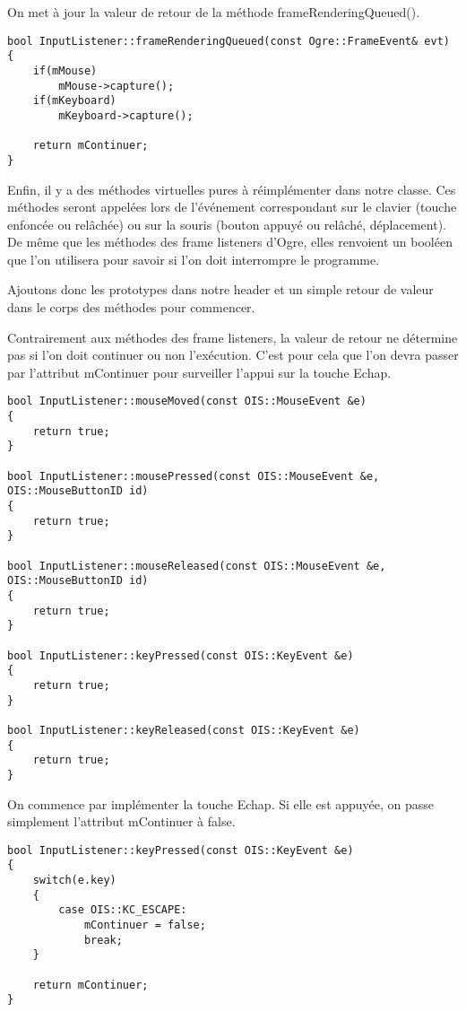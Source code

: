 On met \`a jour la valeur de retour de la m\'ethode frameRenderingQueued().

\begin{lstlisting}[caption={}]
bool InputListener::frameRenderingQueued(const Ogre::FrameEvent& evt)
{
    if(mMouse)
        mMouse->capture();
    if(mKeyboard)
        mKeyboard->capture();

    return mContinuer;
}
\end{lstlisting}

Enfin, il y a des m\'ethodes virtuelles pures \`a r\'eimpl\'ementer dans notre classe. Ces m\'ethodes seront appel\'ees lors de l'\'ev\'enement correspondant sur le clavier (touche enfonc\'ee ou rel\^ach\'ee) ou sur la souris (bouton appuy\'e ou rel\^ach\'e, d\'eplacement). De m\^eme que les m\'ethodes des frame listeners d'Ogre, elles renvoient un bool\'een que l'on utilisera pour savoir si l'on doit interrompre le programme.

Ajoutons donc les prototypes dans notre header et un simple retour de valeur dans le corps des m\'ethodes pour commencer.

Contrairement aux m\'ethodes des frame listeners, la valeur de retour ne d\'etermine pas si l'on doit continuer ou non l'ex\'ecution. C'est pour cela que l'on devra passer par l'attribut mContinuer pour surveiller l'appui sur la touche Echap.


\begin{lstlisting}[caption={M\'ethodes virtuelles appel\'ees lors d'un \'ev\`enement sur un p\'eriph\'erique}]
bool InputListener::mouseMoved(const OIS::MouseEvent &e)
{
    return true;
}

bool InputListener::mousePressed(const OIS::MouseEvent &e, OIS::MouseButtonID id)
{
    return true;
}

bool InputListener::mouseReleased(const OIS::MouseEvent &e, OIS::MouseButtonID id)
{
    return true;
}

bool InputListener::keyPressed(const OIS::KeyEvent &e)
{
    return true;
}

bool InputListener::keyReleased(const OIS::KeyEvent &e)
{
    return true;
}
\end{lstlisting}

On commence par impl\'ementer la touche Echap. Si elle est appuy\'ee, on passe simplement l'attribut mContinuer \`a false.

\begin{lstlisting}[caption={Impl\'ementation de l'appuie sur ECHAP}]
bool InputListener::keyPressed(const OIS::KeyEvent &e)
{
    switch(e.key)
    {
        case OIS::KC_ESCAPE:
            mContinuer = false;
            break;
    }

    return mContinuer;
}
\end{lstlisting}


